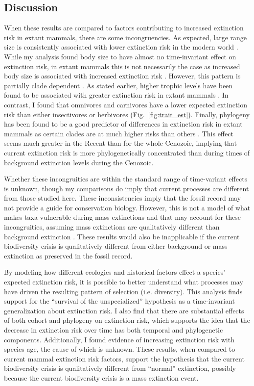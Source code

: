 \documentclass{pnastwo}
\begin{document}
\begin{article}
\section{Discussion}
When these results are compared to factors contributing to increased extinction risk in extant mammals, there are some incongruencies. As expected, large range size is consistently associated with lower extinction risk in the modern world \cite{Liow2009,Purvis2000a,Fritz2009,Fritz2010b}. While my analysis found body size to have almost no time-invariant effect on extinction risk, in extant mammals this is not necessarily the case as increased body size is associated with increased extinction risk \cite{Liow2009,Purvis2000a}. However, this pattern is partially clade dependent \cite{Fritz2009}. As stated earlier, higher trophic levels have been found to be associated with greater extinction risk in extant mammals \cite{Liow2009,Purvis2000a}. In contrast, I found that omnivores and carnivores have a lower expected extinction risk than either insectivores or herbivores (Fig.~\ref{fig:trait_est}). Finally, phylogeny has been found to be a good predictor of differences in extinction risk in extant mammals as certain clades are at much higher risks than others \cite{Fritz2010b}. This effect seems much greater in the Recent than for the whole Cenozoic, implying that current extinction risk is more phylogenetically concentrated than during times of background extinction levels during the Cenozoic.

Whether these incongruities are within the standard range of time-variant effects is unknown, though my comparisons do imply that current processes are different from those studied here. These inconsistencies imply that the fossil record may not provide a guide for conservation biology. However, this is not a model of what makes taxa vulnerable during mass extinctions and that may account for these incongruities, assuming mass extinctions are qualitatively different than background extinction \cite{Jablonski1986}. These results would also be inapplicable if the current biodiversity crisis is qualitatively different from either background or mass extinction as preserved in the fossil record.

By modeling how different ecologies and historical factors effect a species' expected extinction risk, it is possible to better understand what processes may have driven the resulting pattern of selection (i.e. diversity). This analysis finds support for the ``survival of the unspecialized'' hypothesis \cite{Simpson1944,Liow2004a} as a time-invariant generalization about extinction risk. I also find that there are substantial effects of both cohort and phylogeny on extinction risk, which supports the idea that the decrease in extinction risk \cite{Raup1982a} over time has both temporal and phylogenetic components. Additionally, I found evidence of increasing extinction risk with species age, the cause of which is unknown. These results, when compared to current mammal extinction risk factors, support the hypothesis that the current biodiversity crisis is qualitatively different from ``normal'' extinction, possibly because the current biodiversity crisis is a mass extinction event.



\end{article}
\end{document}
